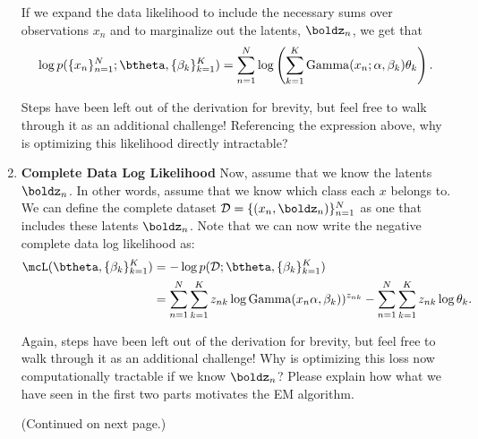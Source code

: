 \documentclass[submit]{harvardml}
\begin{document}
\begin{problem}
\begin{enumerate}
    If we expand the data
    likelihood to include the necessary sums over observations
    $x_n$ and to marginalize out the latents,
    $\boldz_n$, we get that $$\log
    p(\{x_n\}^N_{n=1}; \btheta, \{\beta_k\}^K_{k = 1}) = \sum_{n = 1}^N \log \left( \sum_{k = 1}^K \operatorname{Gamma}(x_n; \alpha, \beta_k)  \theta_k  \right).$$
    
    Steps have been left out of the derivation for brevity, but feel free to walk through it as an additional challenge! Referencing the expression above, why is optimizing this likelihood directly intractable?

\item \textbf{Complete Data Log Likelihood} Now, assume that we know the latents $\boldz_n$. In other words, assume that we know which class each $x$ belongs to. We can define the complete dataset
  $\mathcal D = \{(x_n, \boldz_n)\}_{n=1}^N$ as one that includes these latents $\boldz_n$. Note that we can now write the negative complete data log likelihood as: 
  \begin{align*}
      \mcL(\btheta, \{\beta_k\}^K_{k=1}) &=  -\log p(\mathcal D; \btheta, \{\beta_k\}^K_{k=1}) \\
      &= \sum_{n = 1}^N \sum_{k = 1}^K z_{nk} \log \operatorname{Gamma}(x_n \alpha, \beta_k))^{z_{nk}} - \sum_{n = 1}^N \sum_{k = 1}^K z_{nk} \log\theta_k.
  \end{align*}

  Again, steps have been left out of the derivation for brevity, but feel free to walk through it as an additional challenge! Why is optimizing this loss now computationally tractable if we know $\boldz_n$? Please explain how what we have seen in the first two parts motivates the EM algorithm.

  (Continued on next page.)

\end{enumerate}

\end{problem}

\newpage
\end{document}
